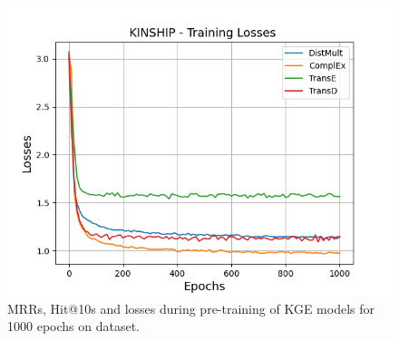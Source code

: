 \begin{figure}[H]
\begin{minipage}{.3\textwidth}
      \includegraphics[width=\linewidth]{figures/results/pretrain/kinship/pretrain_kinship_losses.png}
    \end{minipage}%
    \caption{MRRs, Hit@10s and losses during pre-training of \ac{KGE} models for 1000 epochs on \kinship dataset.}
    \label{fig:pretraining}
\end{figure}
